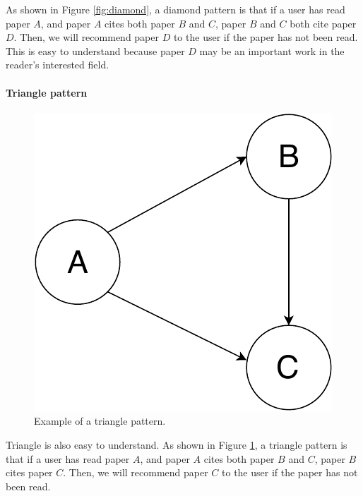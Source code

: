 As shown in Figure \ref{fig:diamond}, a diamond pattern is that if a user has read paper $A$, and paper $A$ cites both paper $B$ and $C$, paper $B$ and $C$ both cite paper $D$. Then, we will recommend paper $D$ to the user if the paper has not been read. This is easy to understand because paper $D$ may be an important work in the reader's interested field.

\paragraph{Triangle pattern}

\begin{figure}[t]
	\centering
	\includegraphics[width=0.7\linewidth]{triangle}
	\caption{Example of a triangle pattern.}
	\label{fig:triangle}
\end{figure}

Triangle is also easy to understand. As shown in Figure \ref{fig:triangle}, a triangle pattern is that if a user has read paper $A$, and paper $A$ cites both paper $B$ and $C$, paper $B$ cites paper $C$. Then, we will recommend paper $C$ to the user if the paper has not been read. 

